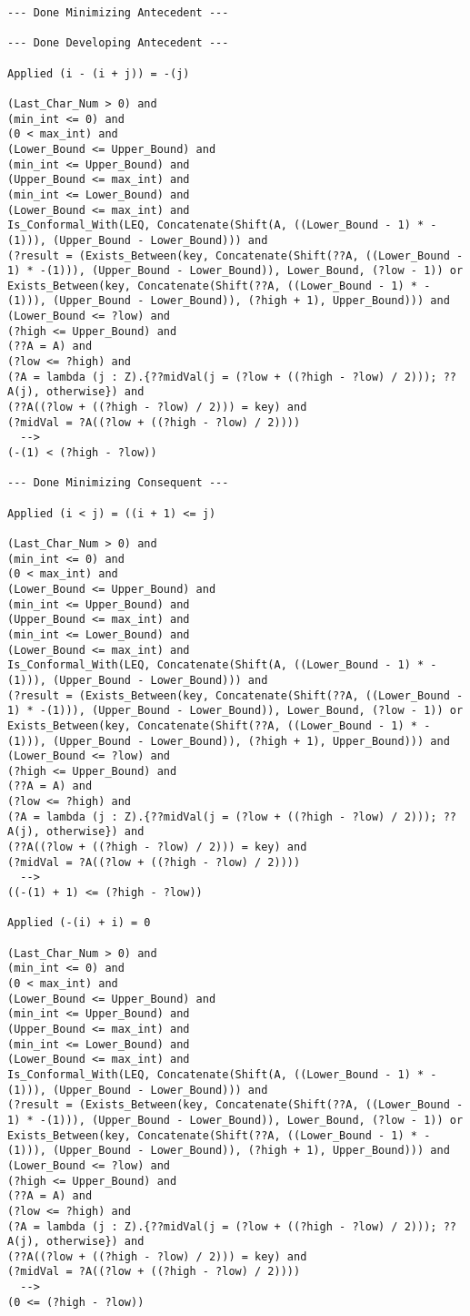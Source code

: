 \begin{lstlisting}[language=resolve]
--- Done Minimizing Antecedent ---

--- Done Developing Antecedent ---

Applied (i - (i + j)) = -(j)

(Last_Char_Num > 0) and
(min_int <= 0) and
(0 < max_int) and
(Lower_Bound <= Upper_Bound) and
(min_int <= Upper_Bound) and
(Upper_Bound <= max_int) and
(min_int <= Lower_Bound) and
(Lower_Bound <= max_int) and
Is_Conformal_With(LEQ, Concatenate(Shift(A, ((Lower_Bound - 1) * -(1))), (Upper_Bound - Lower_Bound))) and
(?result = (Exists_Between(key, Concatenate(Shift(??A, ((Lower_Bound - 1) * -(1))), (Upper_Bound - Lower_Bound)), Lower_Bound, (?low - 1)) or Exists_Between(key, Concatenate(Shift(??A, ((Lower_Bound - 1) * -(1))), (Upper_Bound - Lower_Bound)), (?high + 1), Upper_Bound))) and
(Lower_Bound <= ?low) and
(?high <= Upper_Bound) and
(??A = A) and
(?low <= ?high) and
(?A = lambda (j : Z).{??midVal(j = (?low + ((?high - ?low) / 2))); ??A(j), otherwise}) and
(??A((?low + ((?high - ?low) / 2))) = key) and
(?midVal = ?A((?low + ((?high - ?low) / 2))))
  -->
(-(1) < (?high - ?low))

--- Done Minimizing Consequent ---

Applied (i < j) = ((i + 1) <= j)

(Last_Char_Num > 0) and
(min_int <= 0) and
(0 < max_int) and
(Lower_Bound <= Upper_Bound) and
(min_int <= Upper_Bound) and
(Upper_Bound <= max_int) and
(min_int <= Lower_Bound) and
(Lower_Bound <= max_int) and
Is_Conformal_With(LEQ, Concatenate(Shift(A, ((Lower_Bound - 1) * -(1))), (Upper_Bound - Lower_Bound))) and
(?result = (Exists_Between(key, Concatenate(Shift(??A, ((Lower_Bound - 1) * -(1))), (Upper_Bound - Lower_Bound)), Lower_Bound, (?low - 1)) or Exists_Between(key, Concatenate(Shift(??A, ((Lower_Bound - 1) * -(1))), (Upper_Bound - Lower_Bound)), (?high + 1), Upper_Bound))) and
(Lower_Bound <= ?low) and
(?high <= Upper_Bound) and
(??A = A) and
(?low <= ?high) and
(?A = lambda (j : Z).{??midVal(j = (?low + ((?high - ?low) / 2))); ??A(j), otherwise}) and
(??A((?low + ((?high - ?low) / 2))) = key) and
(?midVal = ?A((?low + ((?high - ?low) / 2))))
  -->
((-(1) + 1) <= (?high - ?low))

Applied (-(i) + i) = 0

(Last_Char_Num > 0) and
(min_int <= 0) and
(0 < max_int) and
(Lower_Bound <= Upper_Bound) and
(min_int <= Upper_Bound) and
(Upper_Bound <= max_int) and
(min_int <= Lower_Bound) and
(Lower_Bound <= max_int) and
Is_Conformal_With(LEQ, Concatenate(Shift(A, ((Lower_Bound - 1) * -(1))), (Upper_Bound - Lower_Bound))) and
(?result = (Exists_Between(key, Concatenate(Shift(??A, ((Lower_Bound - 1) * -(1))), (Upper_Bound - Lower_Bound)), Lower_Bound, (?low - 1)) or Exists_Between(key, Concatenate(Shift(??A, ((Lower_Bound - 1) * -(1))), (Upper_Bound - Lower_Bound)), (?high + 1), Upper_Bound))) and
(Lower_Bound <= ?low) and
(?high <= Upper_Bound) and
(??A = A) and
(?low <= ?high) and
(?A = lambda (j : Z).{??midVal(j = (?low + ((?high - ?low) / 2))); ??A(j), otherwise}) and
(??A((?low + ((?high - ?low) / 2))) = key) and
(?midVal = ?A((?low + ((?high - ?low) / 2))))
  -->
(0 <= (?high - ?low))


\end{lstlisting}

